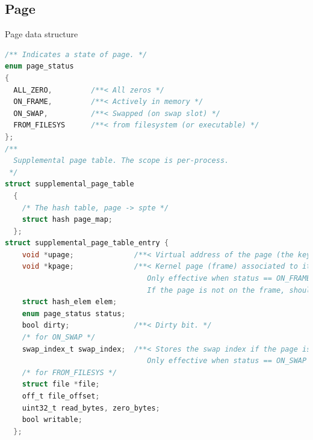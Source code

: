 \documentclass[10pt]{beamer}
\begin{document}
\subsection{Page}
\begin{frame}[fragile]{Page data structure}
\begin{lstlisting}[language=C]
/** Indicates a state of page. */
enum page_status 
{
  ALL_ZERO,         /**< All zeros */
  ON_FRAME,         /**< Actively in memory */
  ON_SWAP,          /**< Swapped (on swap slot) */
  FROM_FILESYS      /**< from filesystem (or executable) */
};
/**
  Supplemental page table. The scope is per-process.
 */
struct supplemental_page_table
  {
    /* The hash table, page -> spte */
    struct hash page_map;
  };
struct supplemental_page_table_entry {
    void *upage;              /**< Virtual address of the page (the key) */
    void *kpage;              /**< Kernel page (frame) associated to it.
                                 Only effective when status == ON_FRAME.
                                 If the page is not on the frame, should be NULL. */
    struct hash_elem elem;
    enum page_status status;
    bool dirty;               /**< Dirty bit. */
    /* for ON_SWAP */
    swap_index_t swap_index;  /**< Stores the swap index if the page is swapped out.
                                 Only effective when status == ON_SWAP */
    /* for FROM_FILESYS */
    struct file *file;
    off_t file_offset;
    uint32_t read_bytes, zero_bytes;
    bool writable;
  };
\end{lstlisting}
\end{frame}
\end{document}

